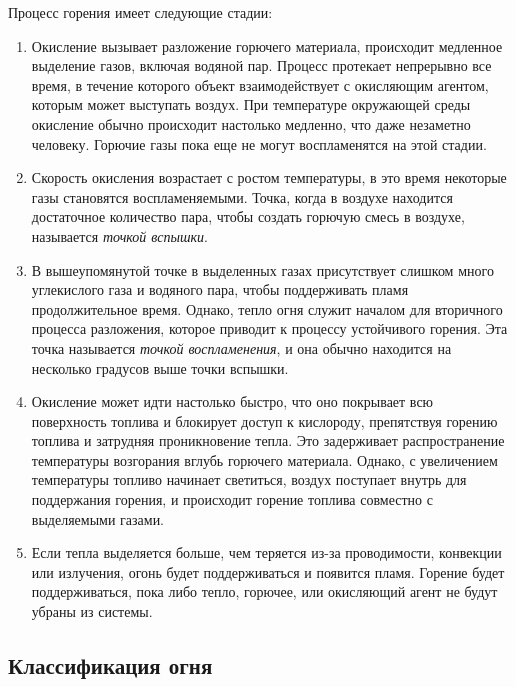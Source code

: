 Процесс горения имеет следующие стадии:
\begin{enumerate}
    \item Окисление вызывает разложение горючего материала, происходит \break{}
        медленное выделение газов, включая водяной пар.  Процесс протекает
        непрерывно все время, в течение которого объект взаимодействует с
        окисляющим агентом, которым может выступать воздух.  При температуре
        окружающей среды окисление обычно происходит настолько медленно, что
        даже незаметно человеку. Горючие газы пока еще не могут воспламенятся на
        этой стадии.

    \item Скорость окисления возрастает с ростом температуры, в это время
        некоторые газы становятся воспламеняемыми. Точка, когда в воздухе
        находится достаточное количество пара, чтобы создать горючую смесь в
        воздухе, называется \emph{точкой вспышки}.

    \item В вышеупомянутой точке в выделенных газах присутствует слишком много
        углекислого газа и водяного пара, чтобы поддерживать пламя
        продолжительное время. Однако, тепло огня служит началом для вторичного
        процесса разложения, которое приводит к процессу устойчивого горения.
        Эта точка называется \emph{точкой воспламенения}, и она обычно находится
        на несколько градусов выше точки вспышки.

    \item Окисление может идти настолько быстро, что оно покрывает всю
        поверхность топлива и блокирует доступ к кислороду, препятствуя горению
        топлива и затрудняя проникновение тепла. Это задерживает распространение
        температуры возгорания вглубь горючего материала. Однако, с увеличением
        температуры топливо начинает светиться, воздух поступает внутрь для
        поддержания горения, и происходит горение топлива совместно с
        выделяемыми газами.

    \item Если тепла выделяется больше, чем теряется из-за проводимости,
        конвекции или излучения, огонь будет поддерживаться и появится пламя.
        Горение будет поддерживаться, пока либо тепло, горючее, или окисляющий
        агент не будут убраны из системы.
\end{enumerate}

\subsection{Классификация огня}

